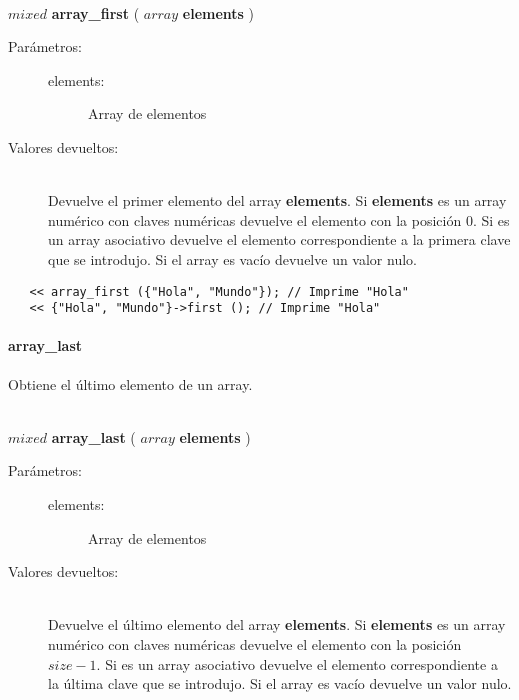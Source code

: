 \begin{framed}
\hfill \\ $mixed$ \textbf{array\_first} ( $array$ \textbf{elements} )  
\begin{description}
\item [Parámetros:] \hfill 
   \begin{description}
   \item[elements:] Array de elementos
   \end{description}
\item[Valores devueltos:] \hfill \\
   Devuelve el primer elemento del array \textbf{elements}. Si \textbf{elements} es un array
   numérico con claves numéricas devuelve el elemento con la posición 0. Si es un array asociativo 
   devuelve el elemento correspondiente a la primera clave que se introdujo. Si el array es vacío 
   devuelve un valor nulo. 
\end{description}
\end{framed}
     
\begin{lstlisting}   
   << array_first ({"Hola", "Mundo"}); // Imprime "Hola"
   << {"Hola", "Mundo"}->first (); // Imprime "Hola"
\end{lstlisting}

\paragraph{array\_last}
Obtiene el último elemento de un array. 

\begin{framed}
\hfill \\ $mixed$ \textbf{array\_last} ( $array$ \textbf{elements} )  
\begin{description}
\item [Parámetros:] \hfill 
   \begin{description}
   \item[elements:] Array de elementos
   \end{description}
\item[Valores devueltos:] \hfill \\
   Devuelve el último elemento del array \textbf{elements}. Si \textbf{elements} es un array
   numérico con claves numéricas devuelve el elemento con la posición $size - 1$. Si es un array asociativo 
   devuelve el elemento correspondiente a la última clave que se introdujo. Si el array es vacío 
   devuelve un valor nulo. 
\end{description}
\end{framed}
     
